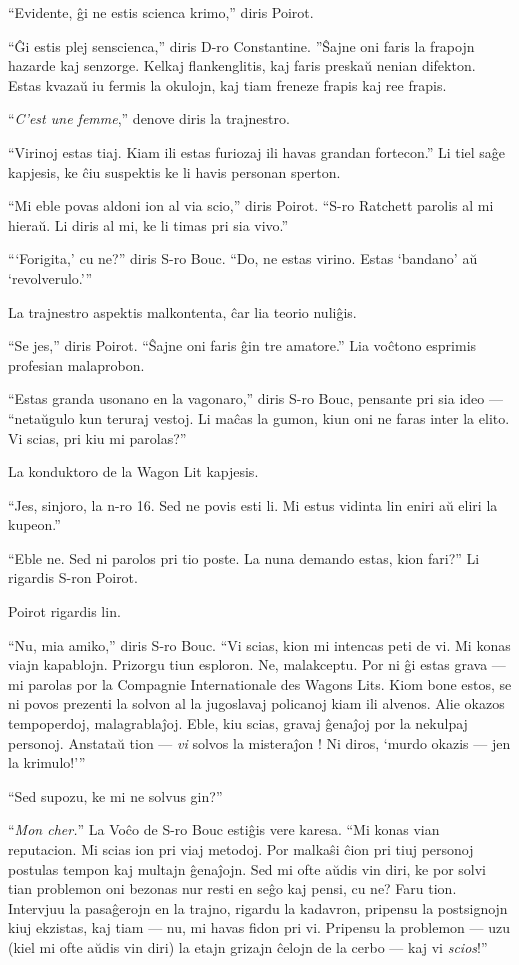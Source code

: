 ``Evidente, ĝi ne estis scienca krimo,'' diris Poirot.

``Ĝi estis plej senscienca,'' diris D-ro Constantine. ''Ŝajne oni faris la frapojn hazarde kaj senzorge. Kelkaj flankenglitis, kaj faris preskaŭ nenian difekton. Estas kvazaŭ iu fermis la okulojn, kaj tiam freneze frapis kaj ree frapis.

``\emph{C'est une femme},'' denove diris la trajnestro.

``Virinoj estas tiaj. Kiam ili estas furiozaj ili havas grandan fortecon.'' Li tiel saĝe kapjesis, ke ĉiu suspektis ke li havis personan sperton.

``Mi eble povas aldoni ion al via scio,'' diris Poirot. ``S-ro Ratchett parolis al mi hieraŭ. Li diris al mi, ke li timas pri sia vivo.''

```Forigita,' cu ne?'' diris S-ro Bouc. ``Do, ne estas virino. Estas `bandano' aŭ `revolverulo.'''

La trajnestro aspektis malkontenta, ĉar lia teorio nuliĝis.

``Se jes,'' diris Poirot. ``Ŝajne oni faris ĝin tre amatore.'' Lia voĉtono esprimis profesian malaprobon.

``Estas granda usonano en la vagonaro,'' diris S-ro Bouc, pensante pri sia ideo --- ``netaŭgulo kun teruraj vestoj. Li maĉas la gumon, kiun oni ne faras inter la elito. Vi scias, pri kiu mi parolas?''

La konduktoro de la Wagon Lit kapjesis.

``Jes, sinjoro, la n-ro 16. Sed ne povis esti li. Mi estus vidinta lin eniri aŭ eliri la kupeon.''

``Eble ne. Sed ni parolos pri tio poste. La nuna demando estas, kion fari?'' Li rigardis S-ron Poirot.

Poirot rigardis lin.

``Nu, mia amiko,'' diris S-ro Bouc. ``Vi scias, kion mi intencas peti de vi. Mi konas viajn kapablojn. Prizorgu tiun esploron. Ne, malakceptu. Por ni ĝi estas grava --- mi parolas por la Compagnie Internationale des Wagons Lits. Kiom bone estos, se ni povos prezenti la solvon al la jugoslavaj policanoj kiam ili alvenos. Alie okazos tempoperdoj, malagrablaĵoj. Eble, kiu scias, gravaj ĝenaĵoj por la nekulpaj personoj. Anstataŭ tion --- \emph{vi} solvos la misteraĵon ! Ni diros, `murdo okazis --- jen la krimulo!'''

``Sed supozu, ke mi ne solvus gin?''

``\emph{Mon cher.}'' La Voĉo de S-ro Bouc estiĝis vere karesa. ``Mi konas vian reputacion. Mi scias ion pri viaj metodoj. Por malkaŝi ĉion pri tiuj personoj postulas tempon kaj multajn ĝenaĵojn. Sed mi ofte aŭdis vin diri, ke por solvi tian problemon oni bezonas nur resti en seĝo kaj pensi, cu ne? Faru tion. Intervjuu la pasaĝerojn en la trajno, rigardu la kadavron, pripensu la postsignojn kiuj ekzistas, kaj tiam --- nu, mi havas fidon pri vi. Pripensu la problemon --- uzu (kiel mi ofte aŭdis vin diri) la etajn grizajn ĉelojn de la cerbo --- kaj vi \emph{scios}!''

